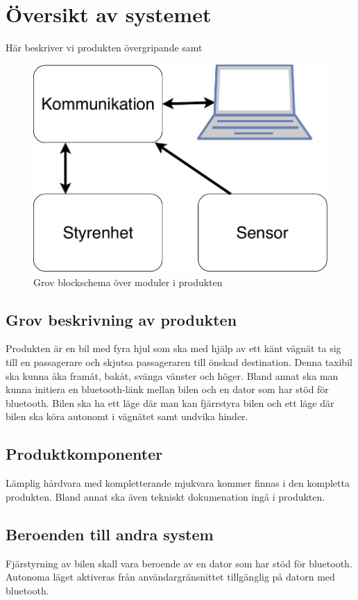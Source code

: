\documentclass[kravspec/krav.tex]{subfiles}
\begin{document}
\section{Översikt av systemet}
Här beskriver vi produkten övergripande samt 
\begin{figure}[h]
    \centering
    \includegraphics[width=0.6\linewidth]{kravspec/figures/overview-schema.pdf}
    \caption{Grov blockschema över moduler i produkten}
    \label{fig:overview}
\end{figure}

\subsection{Grov beskrivning av produkten}
Produkten är en bil med fyra hjul som ska med hjälp av ett känt vägnät ta sig
till en passagerare och skjutsa passageraren till önskad destination. Denna
taxibil ska kunna åka framåt, bakåt, svänga vänster och höger.  Bland annat ska
man kunna initiera en bluetooth-länk mellan bilen och en dator som har stöd för
bluetooth. Bilen ska ha ett läge där man kan fjärrstyra bilen och ett läge där
bilen ska köra autonomt i vägnätet samt undvika hinder.

\subsection{Produktkomponenter}
Lämplig hårdvara med kompletterande mjukvara kommer finnas i den kompletta
produkten. Bland annat ska även tekniskt dokumenation ingå i produkten.

\subsection{Beroenden till andra system}
Fjärstyrning av bilen skall vara beroende av en dator som har stöd för bluetooth.
Autonoma läget aktiveras från användargränsnittet tillgänglig på datorn med
bluetooth.
\end{document}
